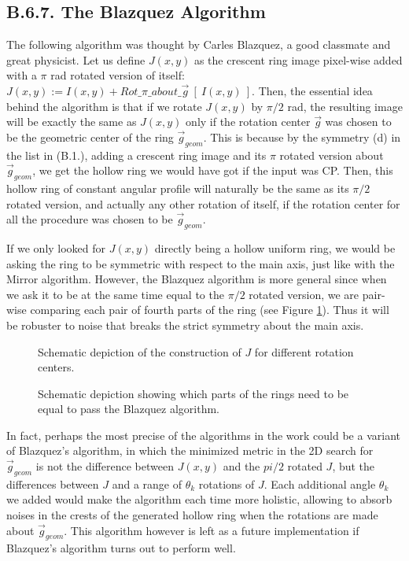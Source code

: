 \documentclass[11pt, a4paper, twoside]{article} %
\begin{document}
\subsection*{B.6.7. The Blazquez Algorithm}
The following algorithm was thought by Carles Blazquez, a good classmate and great physicist. Let us define $J(x,y)$ as the crescent ring image pixel-wise added with a $\pi$ rad rotated version of itself: $J(x,y):=I(x,y)+Rot\_\pi\_about\_\vec{g}\ [\ I(x,y)\ ]$. Then, the essential idea behind the algorithm is that if we rotate $J(x,y)$ by $\pi/2$ rad, the resulting image will be exactly the same as $J(x,y)$ only if the rotation center $\vec{g}$ was chosen to be the geometric center of the ring $\vec{g}_{geom}$. This is because by the symmetry (d) in the list in (B.1.), adding a crescent ring image and its $\pi$ rotated version about $\vec{g}_{geom}$, we get the hollow ring we would have got if the input was CP. Then, this hollow ring of constant angular profile will naturally be the same as its $\pi/2$ rotated version, and actually any other rotation of itself, if the rotation center for all the procedure was chosen to be $\vec{g}_{geom}$.

If we only looked for $J(x,y)$ directly being a hollow uniform ring, we would be asking the ring to be symmetric with respect to the main axis, just like with the Mirror algorithm. However, the Blazquez algorithm is more general since when we ask it to be at the same time equal to the $\pi/2$ rotated version, we are pair-wise comparing each pair of fourth parts of the ring (see Figure \ref{fig:blaz}). Thus it will be robuster to noise that breaks the strict symmetry about the main axis.

\begin{figure}[h!] 
     \centering 
    \caption{ Schematic depiction of the construction of $J$ for different rotation centers. }
    \label{fig:blaz}
\end{figure}

\begin{figure}[h!] 
     \centering 
    \caption{ Schematic depiction showing which parts of the rings need to be equal to pass the Blazquez algorithm. }
    \label{fig:blaz2}
\end{figure}

In fact, perhaps the most precise of the algorithms in the work could be a variant of Blazquez's algorithm, in which the minimized metric in the 2D search for $\vec{g}_{geom}$ is not the difference between $J(x,y)$ and the $pi/2$ rotated $J$, but the differences between $J$ and a range of $\theta_k$ rotations of $J$. Each additional angle $\theta_k$ we added would make the algorithm each time more holistic, allowing to absorb noises in the crests of the generated hollow ring when the rotations are made about $\vec{g}_{geom}$. This algorithm however is left as a future implementation if Blazquez's algorithm turns out to perform well.
\end{document}

